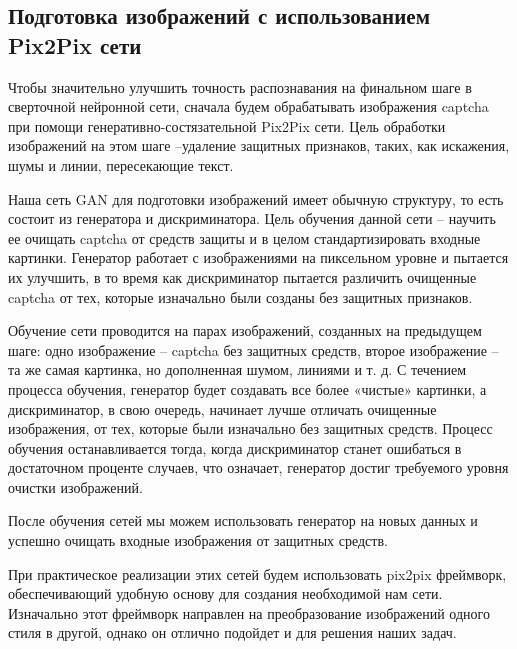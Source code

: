 \subsection{Подготовка изображений с использованием Pix2Pix сети}
Чтобы значительно улучшить точность распознавания на финальном шаге в сверточной нейронной сети, сначала будем обрабатывать изображения captcha при помощи генеративно-состязательной Pix2Pix сети. Цель обработки изображений на этом шаге --удаление защитных признаков, таких, как искажения, шумы и линии, пересекающие текст.

Наша сеть GAN для подготовки изображений имеет обычную структуру, то есть состоит из генератора и дискриминатора. Цель обучения данной сети – научить ее очищать captcha от средств защиты и в целом стандартизировать входные картинки. Генератор работает с изображениями на пиксельном уровне и пытается их улучшить, в то время как дискриминатор пытается различить очищенные captcha от тех, которые изначально были созданы без защитных признаков.

Обучение сети проводится на парах изображений, созданных на предыдущем шаге: одно изображение -- captcha без защитных средств, второе изображение – та же самая картинка, но дополненная шумом, линиями и т. д. С течением процесса обучения, генератор будет создавать все более «чистые» картинки, а дискриминатор, в свою очередь, начинает лучше отличать очищенные изображения, от тех, которые были изначально без защитных средств. Процесс обучения останавливается тогда, когда дискриминатор станет ошибаться в достаточном проценте случаев, что означает, генератор достиг требуемого уровня очистки изображений.

После обучения сетей мы можем использовать генератор на новых данных и успешно очищать входные изображения от защитных средств.

При практическое реализации этих сетей будем использовать pix2pix фреймворк\cite{pix2pix-framework}, обеспечивающий удобную основу для создания необходимой нам сети. Изначально этот фреймворк направлен на преобразование изображений одного стиля в другой, однако он отлично подойдет и для решения наших задач. 
